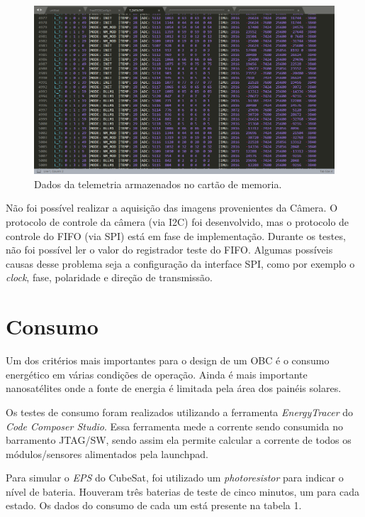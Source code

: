 \begin{figure}[h]
	\centering
	
	\includegraphics[keepaspectratio=true,scale=0.48]{figuras/telemetryData.PNG}
	\caption{Dados da telemetria armazenados no cartão de memoria.}
	\label{telemetryData}
\end{figure}
\FloatBarrier
Não foi possível realizar a aquisição das imagens provenientes da Câmera. O protocolo de controle da câmera (via I2C)  foi desenvolvido, mas o protocolo de controle do FIFO (via SPI) está em fase de implementação. Durante os testes, não foi possível ler o valor do registrador teste do FIFO. Algumas possíveis causas desse problema seja a configuração da interface SPI, como por exemplo o \textit{clock}, fase, polaridade e direção de transmissão. 

\section{Consumo}

Um dos critérios mais importantes para o design de um OBC é o consumo energético em várias condições de operação. Ainda é mais importante nanosatélites onde a fonte de energia é limitada pela área dos painéis solares. 

Os testes de consumo foram realizados utilizando a ferramenta \textit{EnergyTracer} do \textit{Code Composer Studio}. Essa ferramenta mede a corrente sendo consumida no barramento JTAG/SW, sendo assim ela permite calcular a corrente de todos os módulos/sensores alimentados pela launchpad. 

Para simular o \textit{EPS} do CubeSat, foi utilizado um \textit{photoresistor} para indicar o nível de bateria. Houveram três baterias de teste de cinco minutos, um para cada estado. Os dados do consumo de cada um está presente na tabela 1.

